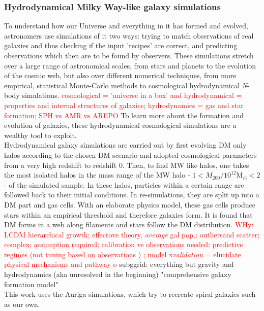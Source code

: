 \subsubsection{Hydrodynamical Milky Way-like galaxy simulations}\label{subsubsec:hydro_sim}
To understand how our Universe and everything in it has formed and evolved, astronomers use simulations of it two ways: trying to match observations of real galaxies and thus checking if the input 'recipes' are correct, and predicting observations which then are to be found by observers. These simulations stretch over a large range of astronomical scales, from stars and planets to the evolution of the cosmic web, but also over different numerical techniques, from more empirical, statistical Monte-Carlo methods to cosmological hydrodynamical \textit{N}-body simulations. \textcolor{red}{cosmological = 'universe in a box' and hydrodynamical = properties and internal structures of galaxies; hydrodynamics = gas and star formation; SPH vs AMR vs AREPO} 
To learn more about the formation and evolution of galaxies, these hydrodynamical cosmological simulations are a wealthy tool to exploit. 
\\Hydrodynamical galaxy simulations are carried out by first evolving \ac{DM} only halos according to the chosen \ac{DM} scenario and adopted cosmological parameters from a very high redshift to redshift 0. Then, to find \ac{MW} like halos, one takes the most isolated halos in the mass range of the \ac{MW} halo - $1 < M_{200} / 10^{12} \mathrm{M}_\odot < 2$ - of the simulated sample. In these halos, particles within a certain range are followed back to their initial conditions. In re-simulations, they are split up into a \ac{DM} part and gas cells. With an elaborate physics model, these gas cells produce stars within an empirical threshold and therefore galaxies form. It is found that \ac{DM} forms in a web along filaments and stars follow the \ac{DM} distribution. 
\textcolor{red}{WHy: LCDM hierarchical growth; effectove theory, \textit{average} gal pop,; outliersand scatter; complex: assumption required; calibration vs observations needed; predictive regimes (not tuning based on observations ) ; model x\textit{validation} = elucidate physical mechanisms and pathway o} subggrid: everything but gravity and hydrodynamics (aka unresolved in the beginning) "comprehensive galaxy formation model"
\\This work uses the Auriga \citep{AurigaGrand} simulations, which try to recreate spiral galaxies such as our own. 
